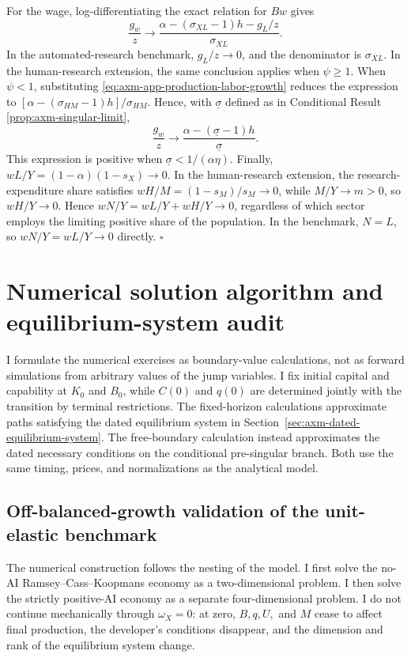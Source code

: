 For the wage, log-differentiating the exact relation for \(Bw\) gives
\[
 \frac{g_w}{z}
 \to\frac{\alpha-(\sigma_{XL}-1)h-g_L/z}{\sigma_{XL}}.
\]
In the automated-research benchmark, \(g_L/z\to0\), and the denominator is
\(\sigma_{XL}\). In the human-research extension, the same conclusion applies
when \(\psi\geq1\). When \(\psi<1\), substituting
\eqref{eq:axm-app-production-labor-growth} reduces the expression to
\([\alpha-(\sigma_{HM}-1)h]/\sigma_{HM}\). Hence, with
\(\underline\sigma\) defined as in Conditional Result
\ref{prop:axm-singular-limit},
\[
 \frac{g_w}{z}\to
 \frac{\alpha-(\underline\sigma-1)h}{\underline\sigma}.
\]
This expression is positive when
\(\underline\sigma<1/(\alpha\eta)\). Finally,
\(wL/Y=(1-\alpha)(1-s_X)\to0\). In the human-research extension, the
research-expenditure share satisfies \(wH/M=(1-s_M)/s_M\to0\), while
\(M/Y\to m>0\), so \(wH/Y\to0\). Hence \(wN/Y=wL/Y+wH/Y\to0\), regardless
of which sector employs the limiting positive share of the population. In the
benchmark, \(N=L\), so \(wN/Y=wL/Y\to0\) directly. \(\square\)

\section{Numerical solution algorithm and equilibrium-system audit}
\label{app:axm-numerical-algorithm}

I formulate the numerical exercises as boundary-value calculations, not as forward
simulations from arbitrary values of the jump variables. I fix initial capital and
capability at \(K_0\) and \(B_0\), while \(C(0)\) and \(q(0)\) are
determined jointly with the transition by terminal restrictions. The fixed-horizon
calculations approximate paths satisfying the dated equilibrium system in
Section~\ref{sec:axm-dated-equilibrium-system}. The free-boundary calculation
instead approximates the dated necessary conditions on the conditional
pre-singular branch. Both use the same timing, prices, and normalizations as the
analytical model.

\subsection{Off-balanced-growth validation of the unit-elastic benchmark}
\label{app:axm-off-bgp-validation}

The numerical construction follows the nesting of the model. I first solve the
no-AI Ramsey--Cass--Koopmans economy as a two-dimensional problem. I then solve
the strictly positive-AI economy as a separate four-dimensional problem. I do
not continue mechanically through \(\omega_X=0\): at zero, \(B,q,U,\) and
\(M\) cease to affect final production, the developer's conditions disappear,
and the dimension and rank of the equilibrium system change.

